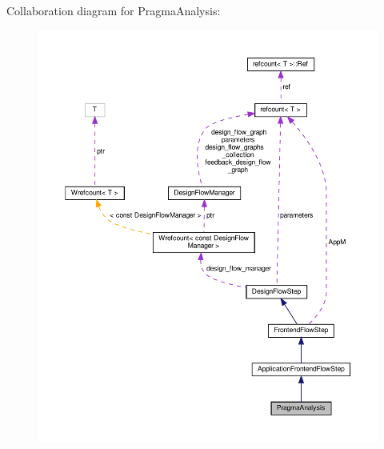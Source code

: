 Collaboration diagram for Pragma\+Analysis\+:
\nopagebreak
\begin{figure}[H]
\begin{center}
\leavevmode
\includegraphics[width=350pt]{db/d3f/classPragmaAnalysis__coll__graph}
\end{center}
\end{figure}
